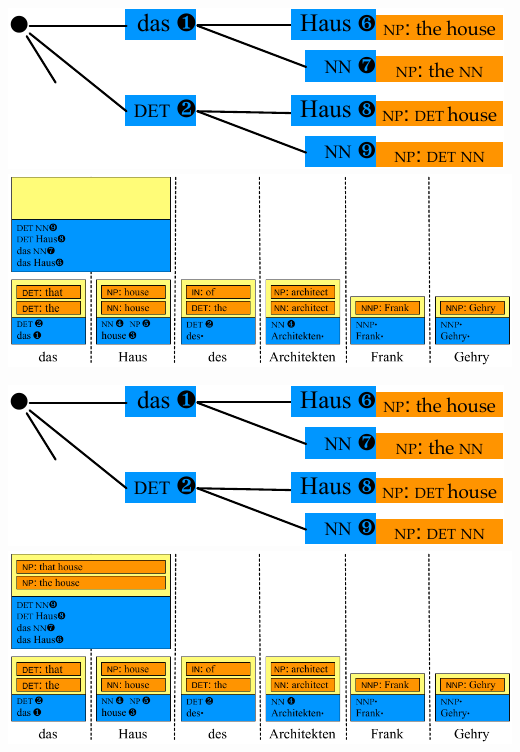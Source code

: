 \documentclass[landscape]{slides}
\begin{document}

\begin{center}\vspace{7mm}
\includegraphics[scale=1.4]{accessing-grammar-rules-prefix-early8.pdf}\\[9mm]
\includegraphics[scale=1.4]{accessing-grammar-rules-early-example10.pdf}
\end{center}


\begin{center}\vspace{7mm}
\includegraphics[scale=1.4]{accessing-grammar-rules-prefix-early8.pdf}\\[9mm]
\includegraphics[scale=1.4]{accessing-grammar-rules-early-example11.pdf}
\end{center}
\end{document}
